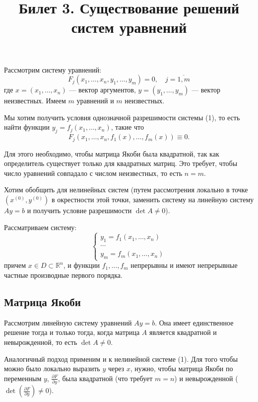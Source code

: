 \documentclass{article}
\title{ Билет 3. Существование решений систем уравнений}
\author{}
\date{}
\begin{document}
\maketitle

Рассмотрим систему уравнений:
\begin{equation}
F_j(x_1, \dots, x_n, y_1, \dots, y_m) = 0, \quad j = \overline{1,m} \tag{1}
\end{equation}
где $x = (x_1, \dots, x_n)$ — вектор аргументов, $y = (y_1, \dots, y_m)$ — вектор неизвестных. Имеем $m$ уравнений и $m$ неизвестных.

Мы хотим получить условия однозначной разрешимости системы (1), то есть найти функции $y_j = f_j(x_1, \dots, x_n)$, такие что
\[
F_j(x_1, \dots, x_n, f_1(x), \dots, f_m(x)) \equiv 0.
\]

Для этого необходимо, чтобы матрица Якоби была квадратной, так как определитель существует только для квадратных матриц. Это требует, чтобы число уравнений совпадало с числом неизвестных, то есть $n = m$.

Хотим обобщить для нелинейных систем (путем рассмотрения локально в точке $(x^{(0)}, y^{(0)})$ в окрестности этой точки, заменить систему на линейную систему $A{y} = {b}$ и получить условие разрешимости $\det A \neq 0$).

Рассматриваем систему:
\[
\begin{cases}
y_1 = f_1(x_1, \dots, x_n) \\
\cdots \\
y_m = f_m(x_1, \dots, x_n)  \tag{4}
\end{cases}
\]
причем $x \in D \subset \mathbb{R}^n$, и функции $f_1, \dots, f_m$ непрерывны и имеют непрерывные частные производные первого порядка.

\subsection*{Матрица Якоби}

Рассмотрим линейную систему уравнений $A{y} = {b}$. Она имеет единственное решение тогда и только тогда, когда матрица $A$ является квадратной и невырожденной, то есть $\det A \neq 0$.

Аналогичный подход применим и к нелинейной системе (1). Для того чтобы можно было локально выразить $y$ через $x$, нужно, чтобы матрица Якоби по переменным $y$, $\frac{\partial F}{\partial y}$, была квадратной (что требует $m=n$) и невырожденной ($\det \left( \frac{\partial F}{\partial y} \right) \neq 0$).
\end{document}
